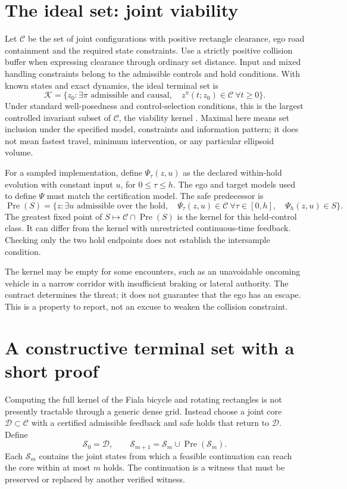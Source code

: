 \documentclass[11pt]{article}
\newcommand{\C}{\mathcal C}
\newcommand{\K}{\mathcal K}
\newcommand{\D}{\mathcal D}
\newcommand{\Sf}{\mathcal S}
\newcommand{\Pre}{\operatorname{Pre}}
\begin{document}
\section{The ideal set: joint viability}
Let $\C$ be the set of joint configurations with positive rectangle
clearance, ego road containment and the required state constraints.
Use a strictly positive collision buffer when expressing clearance through
ordinary set distance. Input and mixed handling constraints belong to the
admissible controls and hold conditions. With known states and exact
dynamics, the ideal terminal set is
\begin{equation}
\boxed{\K=\{z_0:\exists\pi\text{ admissible and causal},\quad
                  z^\pi(t;z_0)\in\C\ \forall t\geq0\}.}\label{eq:kernel}
\end{equation}
Under standard well-posedness and control-selection conditions, this is
the largest controlled invariant subset of $\C$, the viability kernel
\cite{aubin}. Maximal here means set inclusion under the specified model,
constraints and information pattern; it does not mean fastest travel,
minimum intervention, or any particular ellipsoid volume.

For a sampled implementation, define $\Psi_\tau(z,u)$ as the declared
within-hold evolution with constant input $u$, for $0\leq\tau\leq h$.
The ego and target models used to define $\Psi$ must match the certification
model. The safe predecessor is
\begin{equation}
\Pre(S)=\{z:\exists u\text{ admissible over the hold},\quad
\Psi_\tau(z,u)\in\C\ \forall\tau\in[0,h],\quad\Psi_h(z,u)\in S\}.\label{eq:pre}
\end{equation}
The greatest fixed point of $S\mapsto\C\cap\Pre(S)$ is the kernel for
this held-control class. It can differ from the kernel with unrestricted
continuous-time feedback. Checking only the two hold endpoints does not
establish the intersample condition.

The kernel may be empty for some encounters, such as an unavoidable
oncoming vehicle in a narrow corridor with insufficient braking or lateral
authority. The contract determines the threat; it does not guarantee that
the ego has an escape. This is a property to report, not an excuse to
weaken the collision constraint.

\section{A constructive terminal set with a short proof}
Computing the full kernel of the Fiala bicycle and rotating rectangles
is not presently tractable through a generic dense grid. Instead choose
a joint core $\D\subset\C$ with a certified admissible feedback and safe
holds that return to $\D$. Define
\begin{equation}
\Sf_0=\D,\qquad\Sf_{m+1}=\Sf_m\cup\Pre(\Sf_m).\label{eq:expansion}
\end{equation}
Each $\Sf_m$ contains the joint states from which a feasible continuation
can reach the core within at most $m$ holds. The continuation is a witness
that must be preserved or replaced by another verified witness.
\end{document}

